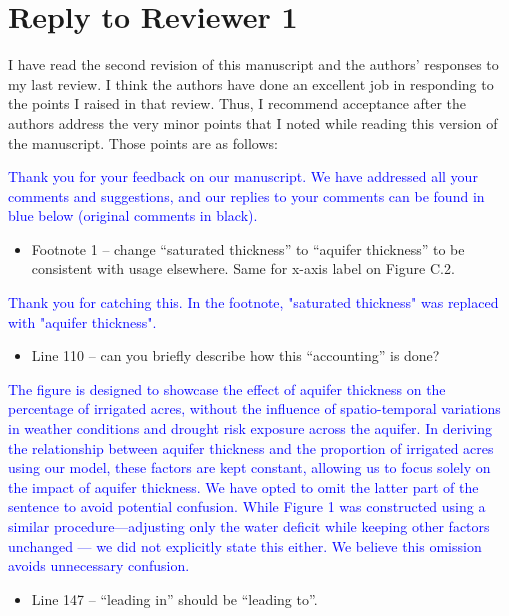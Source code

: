 \documentclass[
]{article}
\author{}
\date{\vspace{-2.5em}}
\providecommand{\tightlist}{%
  \setlength{\itemsep}{0pt}\setlength{\parskip}{0pt}}
\begin{document}
\hypertarget{reply-to-reviewer-1}{%
\section{Reply to Reviewer 1}\label{reply-to-reviewer-1}}

I have read the second revision of this manuscript and the authors'
responses to my last review. I think the authors have done an excellent
job in responding to the points I raised in that review. Thus, I
recommend acceptance after the authors address the very minor points
that I noted while reading this version of the manuscript. Those points
are as follows:

\textcolor{blue}{Thank you for your feedback on our manuscript. We have addressed all your comments and suggestions, and our replies to your comments can be found in blue below (original comments in black).}

\begin{itemize}
\tightlist
\item
  Footnote 1 -- change ``saturated thickness'' to ``aquifer thickness''
  to be consistent with usage elsewhere. Same for x-axis label on Figure
  C.2.
\end{itemize}

\textcolor{blue}{Thank you for catching this. In the footnote, "saturated thickness" was replaced with "aquifer thickness".}

\begin{itemize}
\tightlist
\item
  Line 110 -- can you briefly describe how this ``accounting'' is done?
\end{itemize}

\textcolor{blue}{The figure is designed to showcase the effect of aquifer thickness on the percentage of irrigated acres, without the influence of spatio-temporal variations in weather conditions and drought risk exposure across the aquifer. In deriving the relationship between aquifer thickness and the proportion of irrigated acres using our model, these factors are kept constant, allowing us to focus solely on the impact of aquifer thickness. We have opted to omit the latter part of the sentence to avoid potential confusion. While Figure 1 was constructed using a similar procedure—adjusting only the water deficit while keeping other factors unchanged — we did not explicitly state this either. We believe this omission avoids unnecessary confusion.}

\begin{itemize}
\tightlist
\item
  Line 147 -- ``leading in'' should be ``leading to''.
\end{itemize}
\end{document}
